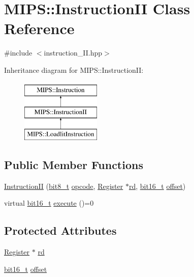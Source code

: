 \hypertarget{classMIPS_1_1InstructionII}{}\section{M\+I\+PS\+:\+:Instruction\+II Class Reference}
\label{classMIPS_1_1InstructionII}


{\ttfamily \#include $<$instruction\+\_\+\+I\+I.\+hpp$>$}

Inheritance diagram for M\+I\+PS\+:\+:Instruction\+II\+:\begin{figure}[H]
\begin{center}
\leavevmode
\includegraphics[height=3.000000cm]{classMIPS_1_1InstructionII}
\end{center}
\end{figure}
\subsection*{Public Member Functions}
\begin{DoxyCompactItemize}
\item 
\hyperlink{classMIPS_1_1InstructionII_a0f84efe08b176134df068fed51aca447}{Instruction\+II} (\hyperlink{core_8hpp_a6074bae122ae7b527864eec42c728c3c}{bit8\+\_\+t} \hyperlink{classMIPS_1_1Instruction_a45cc6808b5dde8a5d41067d148b55476}{opcode}, \hyperlink{classMIPS_1_1Register}{Register} $\ast$\hyperlink{classMIPS_1_1InstructionII_a2a709b8170f2bf653de2102df9403e1f}{rd}, \hyperlink{core_8hpp_adc265a970bc35995b5879784bbb3f1b7}{bit16\+\_\+t} \hyperlink{classMIPS_1_1InstructionII_ae34cdcf18cd37944dfecb96d5b07b5cb}{offset})
\item 
virtual \hyperlink{core_8hpp_adc265a970bc35995b5879784bbb3f1b7}{bit16\+\_\+t} \hyperlink{classMIPS_1_1InstructionII_aa014c5b0fe877746ca4db85c971a2e93}{execute} ()=0
\end{DoxyCompactItemize}
\subsection*{Protected Attributes}
\begin{DoxyCompactItemize}
\item 
\hyperlink{classMIPS_1_1Register}{Register} $\ast$ \hyperlink{classMIPS_1_1InstructionII_a2a709b8170f2bf653de2102df9403e1f}{rd}
\item 
\hyperlink{core_8hpp_adc265a970bc35995b5879784bbb3f1b7}{bit16\+\_\+t} \hyperlink{classMIPS_1_1InstructionII_ae34cdcf18cd37944dfecb96d5b07b5cb}{offset}
\end{DoxyCompactItemize}


